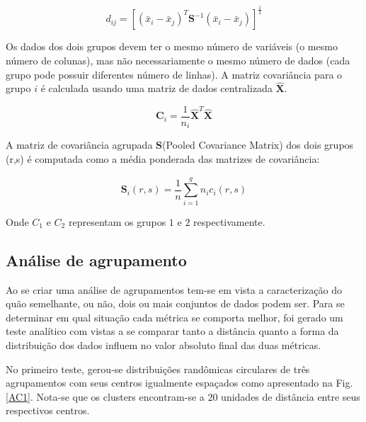 \begin{equation}
d_{ij}=[(\bar{x}_{i}-\bar{x}_{j})^{T}\textbf{S}^{-1}(\bar{x}_{i}-\bar{x}_{j})]^{\frac{1}{2}}
\end{equation}

Os dados dos dois grupos devem ter o mesmo número de variáveis (o mesmo número de colunas), mas não necessariamente o mesmo número de dados (cada grupo pode possuir diferentes número de linhas). A matriz covariância para o grupo $i$ é calculada usando uma matriz de dados centralizada $\hat{\textbf{X}}$.


\begin{equation}
\textbf{C}_{i}=\dfrac{1}{n_{i}} \hat{\textbf{X}}^{T}\hat{\textbf{X}}
\end{equation}

A matriz de covariância agrupada $\textbf{S}$(Pooled Covariance Matrix) dos dois grupos (r,s) é computada como a média ponderada das matrizes de covariância:

\begin{equation}
\textbf{S}_{i}(r,s)=\dfrac{1}{n}\sum^{g}_{i=1}n_{i}c_{i}(r,s)
\end{equation}

Onde $C_{1}$ e $C_{2}$ representam os grupos $1$ e $2$ respectivamente.


\subsection{Análise de agrupamento}

Ao se criar uma análise de agrupamentos tem-se em vista a caracterização do quão semelhante, ou não, dois ou mais conjuntos de dados podem ser.  Para se determinar em qual situação cada métrica se comporta melhor, foi gerado um teste analítico com vistas a se comparar tanto a distância quanto a forma da distribuição dos dados influem no valor absoluto final das duas métricas. 

No primeiro teste, gerou-se distribuições randômicas circulares de três agrupamentos com seus centros igualmente espaçados como apresentado na Fig. \ref{AC1}. Nota-se que os clusters encontram-se a $20$ unidades de distância entre seus respectivos centros. 

